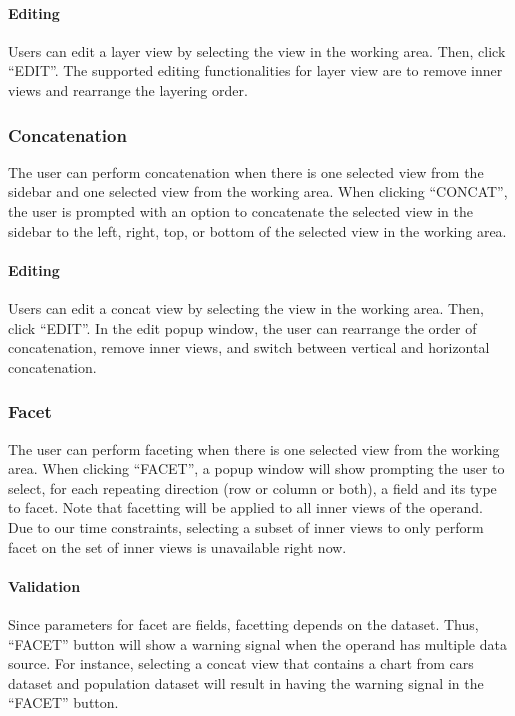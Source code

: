 \documentclass[journal]{vgtc}                %
\begin{document}
\paragraph{Editing} Users can edit a layer view by selecting the view in the
working area. Then, click “EDIT”. The supported editing functionalities for layer
view are to remove inner views and rearrange the layering order.

\subsubsection{Concatenation}
The user can perform concatenation when there is one selected view from the sidebar
and one selected view from the working area. When clicking “CONCAT”, the user is
prompted with an option to concatenate the selected view in the sidebar to the
left, right, top, or bottom of the selected view in the working area.

\paragraph{Editing} Users can edit a concat view by selecting the view in the
working area. Then, click “EDIT”. In the edit popup window, the user can rearrange
the order of concatenation, remove inner views, and switch between vertical and
horizontal concatenation.

\subsubsection{Facet}
The user can perform faceting when there is one selected view from the working
area. When clicking “FACET”, a popup window will show prompting the user to select,
for each repeating direction (row or column or both), a field and its type to facet.
Note that facetting will be applied to all inner views of the operand. Due to our time
constraints, selecting a subset of inner views to only perform facet on the set of
inner views is unavailable right now.

\paragraph{Validation} Since parameters for facet are fields, facetting
depends on the dataset. Thus, “FACET” button will show a warning signal when the
operand has multiple data source. For instance, selecting a concat view that
contains a chart from cars dataset and population dataset will result in having
the warning signal in the “FACET”  button.
\end{document}
